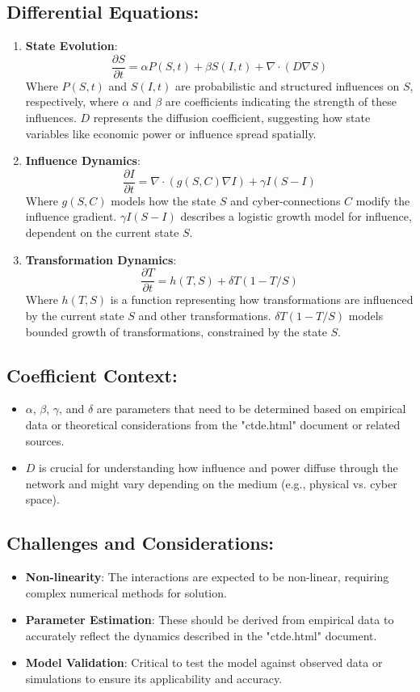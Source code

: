 \documentclass{article}
\begin{document}
\subsection*{Differential Equations:}
\begin{enumerate}
  \item \textbf{State Evolution}:
  \[
  \frac{\partial S}{\partial t} = \alpha P(S, t) + \beta S(I, t) + \nabla \cdot (D \nabla S)
  \]
  Where $P(S, t)$ and $S(I, t)$ are probabilistic and structured influences on $S$, respectively, where $\alpha$ and $\beta$ are coefficients indicating the strength of these influences. $D$ represents the diffusion coefficient, suggesting how state variables like economic power or influence spread spatially.

  \item \textbf{Influence Dynamics}:
  \[
  \frac{\partial I}{\partial t} = \nabla \cdot (g(S, C) \nabla I) + \gamma I(S - I)
  \]
  Where $g(S, C)$ models how the state $S$ and cyber-connections $C$ modify the influence gradient. $\gamma I(S - I)$ describes a logistic growth model for influence, dependent on the current state $S$.

  \item \textbf{Transformation Dynamics}:
  \[
  \frac{\partial T}{\partial t} = h(T, S) + \delta T(1 - T/S)
  \]
  Where $h(T, S)$ is a function representing how transformations are influenced by the current state $S$ and other transformations. $\delta T(1 - T/S)$ models bounded growth of transformations, constrained by the state $S$.
\end{enumerate}

\subsection*{Coefficient Context:}
\begin{itemize}
  \item $\alpha$, $\beta$, $\gamma$, and $\delta$ are parameters that need to be determined based on empirical data or theoretical considerations from the "ctde.html" document or related sources.
  \item $D$ is crucial for understanding how influence and power diffuse through the network and might vary depending on the medium (e.g., physical vs. cyber space).
\end{itemize}

\subsection*{Challenges and Considerations:}
\begin{itemize}
  \item \textbf{Non-linearity}: The interactions are expected to be non-linear, requiring complex numerical methods for solution.
  \item \textbf{Parameter Estimation}: These should be derived from empirical data to accurately reflect the dynamics described in the "ctde.html" document.
  \item \textbf{Model Validation}: Critical to test the model against observed data or simulations to ensure its applicability and accuracy.
\end{itemize}
\end{document}
